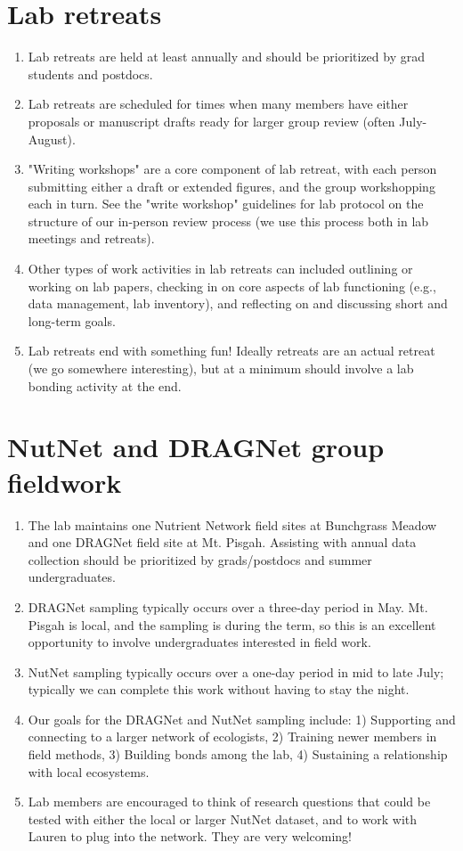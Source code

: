 \documentclass[12pt]{article}
\begin{document}
\section{Lab retreats}
\begin{enumerate}
\item Lab retreats are held at least annually and should be prioritized by grad students and postdocs.
\item Lab retreats are scheduled for times when many members have either proposals or manuscript drafts ready for larger group review (often July-August).
\item "Writing workshops" are a core component of lab retreat, with each person submitting either a draft or extended figures, and the group workshopping each in turn. See the "write workshop" guidelines for lab protocol on the structure of our in-person review process (we use this process both in lab meetings and retreats).
\item Other types of work activities in lab retreats can included outlining or working on lab papers, checking in on core aspects of lab functioning (e.g., data management, lab inventory), and reflecting on and discussing short and long-term goals. 
\item Lab retreats end with something fun! Ideally retreats are an actual retreat (we go somewhere interesting), but at a minimum should involve a lab bonding activity at the end.
\end{enumerate}

\section{NutNet and DRAGNet group fieldwork}
\begin{enumerate}
\item The lab maintains one Nutrient Network field sites at Bunchgrass Meadow and one DRAGNet field site at Mt. Pisgah. Assisting with annual data collection should be prioritized by grads/postdocs and summer undergraduates.
\item DRAGNet sampling typically occurs over a three-day period in May. Mt. Pisgah is local, and the sampling is during the term, so this is an excellent opportunity to involve undergraduates interested in field work.
\item NutNet sampling typically occurs over a one-day period in mid to late July; typically we can complete this work without having to stay the night.
\item Our goals for the DRAGNet and NutNet sampling include: 1) Supporting and connecting to a larger network of ecologists, 2) Training newer members in field methods, 3) Building bonds among the lab, 4) Sustaining a relationship with local ecosystems. 
\item Lab members are encouraged to think of research questions that could be tested with either the local or larger NutNet dataset, and to work with Lauren to plug into the network. They are very welcoming!
\end{enumerate}
\end{document}
